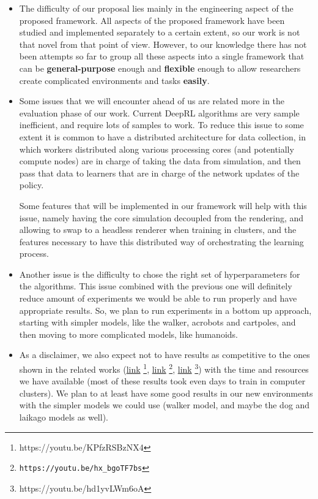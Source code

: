 \begin{itemize}
    \item The difficulty of our proposal lies mainly in the engineering aspect
          of the proposed framework. All aspects of the proposed framework have
          been studied and implemented separately to a certain extent, so our work 
          is not that novel from that point of view. However, to our knowledge there
          has not been attempts so far to group all these aspects into a single
          framework that can be \textbf{general-purpose} enough and \textbf{flexible} 
          enough to allow researchers create complicated environments and tasks
          \textbf{easily}.

    \item Some issues that we will encounter ahead of us are related more in the
          evaluation phase of our work. Current DeepRL algorithms are very sample
          inefficient, and require lots of samples to work. To reduce this issue
          to some extent it is common to have a distributed architecture for data
          collection, in which workers distributed along various processing cores
          (and potentially compute nodes) are in charge of taking the data from
          simulation, and then pass that data to learners that are in charge
          of the network updates of the policy. 

          Some features that will be implemented in our framework will help with
          this issue, namely having the core simulation decoupled from the rendering,
          and allowing to swap to a headless renderer when training in clusters, and
          the features necessary to have this distributed way of orchestrating the
          learning process.

    \item Another issue is the difficulty to chose the right set of hyperparameters
          for the algorithms. This issue combined with the previous one will definitely
          reduce amount of experiments we would be able to run properly and have
          appropriate results. So, we plan to run experiments in a bottom up approach,
          starting with simpler models, like the walker, acrobots and cartpoles,
          and then moving to more complicated models, like humanoids.

    \item As a disclaimer, we also expect not to have results as competitive to
          the ones shown in the related works (\href{https://youtu.be/KPfzRSBzNX4}{link}
          \footnote{https://youtu.be/KPfzRSBzNX4}, \href{https://youtu.be/hx_bgoTF7bs}{link}
          \footnote{\texttt{https://youtu.be/hx\_bgoTF7bs}}, \href{https://youtu.be/hd1yvLWm6oA}{link}
          \footnote{https://youtu.be/hd1yvLWm6oA}) with the time and resources we 
          have available (most of these results took even days to train in computer 
          clusters). We plan to at least have some good results in our new environments 
          with the simpler models we could use (walker model, and maybe the dog and laikago models as well).


\end{itemize}

